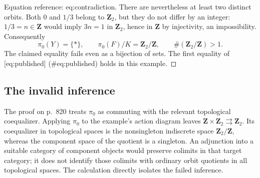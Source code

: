 \documentclass[10pt]{article}
\begin{document}
Equation reference: eq:contradiction. There are nevertheless at least two distinct orbits. Both \(0\) and \(1/3\) belong to \(\mathbf Z_2\), but they do not differ by an integer: \(1/3=n\in\mathbf Z\) would imply \(3n=1\) in \(\mathbf Z_2\), hence in \(\mathbf Z\) by injectivity, an impossibility. Consequently \[
 \pi_0(Y)=\{*\},\qquad
 \pi_0(F)/K=\mathbf Z_2/\mathbf Z,\qquad
 \#(\mathbf Z_2/\mathbf Z)>1.\] The claimed equality fails even as a bijection of sets. The first equality of [eq:published] (\#eq:published) holds in this example. ◻\par
\subsection*{The invalid inference}
The proof on p. 820 treats \(\pi_0\) as commuting with the relevant topological coequalizer. Applying \(\pi_0\) to the example’s action diagram leaves \(\mathbf Z\times\mathbf Z_2\rightrightarrows\mathbf Z_2\). Its coequalizer in topological spaces is the nonsingleton indiscrete space \(\mathbf Z_2/\mathbf Z\), whereas the component space of the quotient is a singleton. An adjunction into a suitable category of component objects would preserve colimits in that target category; it does not identify those colimits with ordinary orbit quotients in all topological spaces. The calculation directly isolates the failed inference.\par
\end{document}
